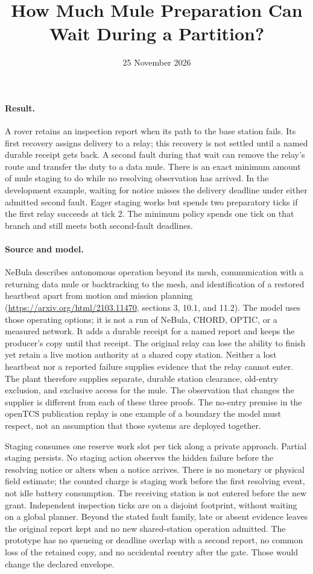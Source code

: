 \documentclass[11pt]{article}
\title{How Much Mule Preparation Can Wait During a Partition?}
\date{25 November 2026}
\begin{document}
\maketitle
\paragraph{Result.}
A rover retains an inspection report when its path to the base station
fails. Its first recovery assigns delivery to a relay; this recovery is
not settled until a named durable receipt gets back. A second fault
during that wait can remove the relay's route and transfer the duty to
a data mule. There is an exact minimum amount of mule staging to do
while no resolving observation has arrived. In the development
example, waiting for notice misses the delivery deadline under either
admitted second fault. Eager staging works but spends two preparatory
ticks if the first relay succeeds at tick 2. The minimum policy
spends one tick on that branch and still meets both second-fault deadlines.

\paragraph{Source and model.}
NeBula describes autonomous operation beyond its mesh, communication
with a returning data mule or backtracking to the mesh, and identification
of a restored heartbeat apart from motion and mission planning
(\url{https://arxiv.org/html/2103.11470}, sections 3, 10.1, and 11.2).
The model uses those operating options; it is not a run of NeBula,
CHORD, OPTIC, or a measured network. It adds a durable receipt
for a named report and keeps the producer's copy until that receipt.
The original relay can lose the ability to finish yet retain a live
motion authority at a shared copy station. Neither a lost heartbeat
nor a reported failure supplies evidence that the relay cannot enter.
The plant therefore supplies separate, durable station clearance,
old-entry exclusion, and exclusive access for the mule. The
observation that changes the supplier is different from each of these
three proofs. The no-entry premise in the openTCS publication replay
is one example of a boundary the model must respect, not an assumption
that those systems are deployed together.

Staging consumes one reserve work slot per tick along a private
approach. Partial staging persists. No staging action observes
the hidden failure before the resolving notice or alters when a
notice arrives. There is no monetary or physical field estimate;
the counted charge is staging work before the first resolving event,
not idle battery consumption. The receiving station is not entered
before the new grant. Independent inspection ticks are on a disjoint
footprint, without waiting on a global planner. Beyond the stated
fault family, late or absent evidence leaves the original report
kept and no new shared-station operation admitted. The prototype
has no queueing or deadline overlap with a second report, no common
loss of the retained copy, and no accidental reentry after the gate.
Those would change the declared envelope.
\end{document}
